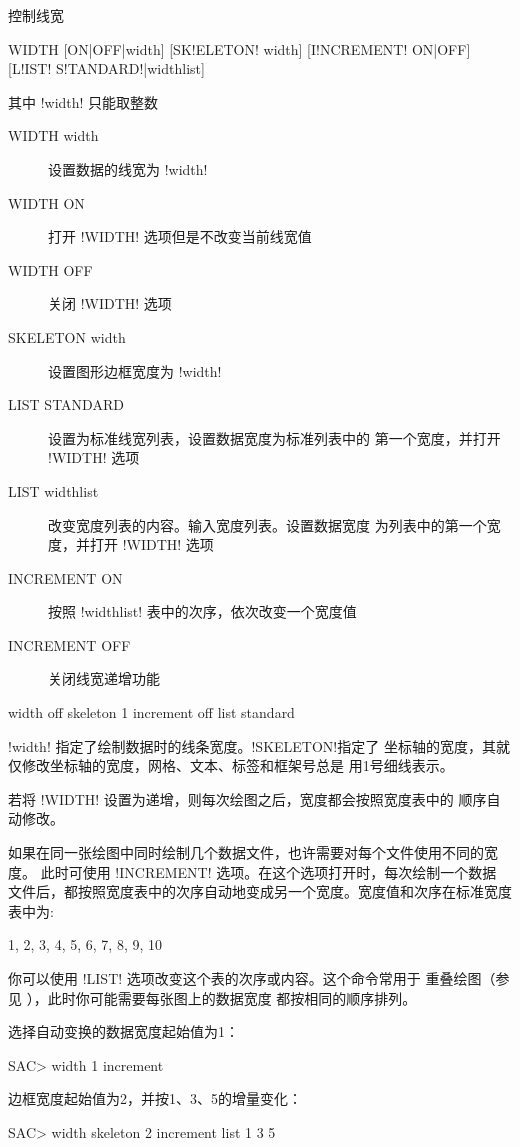 \label{cmd:width}

控制线宽

\begin{SACSTX}
WIDTH [ON|OFF|width] [SK!ELETON! width] [I!NCREMENT! ON|OFF] [L!IST! S!TANDARD!|widthlist]
\end{SACSTX}
其中 !width! 只能取整数

\begin{description}
\item [WIDTH width] 设置数据的线宽为 !width!
\item [WIDTH ON] 打开 !WIDTH! 选项但是不改变当前线宽值
\item [WIDTH OFF] 关闭 !WIDTH! 选项
\item [SKELETON width] 设置图形边框宽度为 !width!
\item [LIST STANDARD] 设置为标准线宽列表，设置数据宽度为标准列表中的
    第一个宽度，并打开 !WIDTH! 选项
\item [LIST widthlist] 改变宽度列表的内容。输入宽度列表。设置数据宽度
    为列表中的第一个宽度，并打开 !WIDTH! 选项
\item [INCREMENT ON] 按照 !widthlist! 表中的次序，依次改变一个宽度值
\item [INCREMENT OFF] 关闭线宽递增功能
\end{description}

\begin{SACDFT}
width off skeleton 1 increment off list standard
\end{SACDFT}

!width! 指定了绘制数据时的线条宽度。!SKELETON!指定了
坐标轴的宽度，其就仅修改坐标轴的宽度，网格、文本、标签和框架号总是
用1号细线表示。

若将 !WIDTH! 设置为递增，则每次绘图之后，宽度都会按照宽度表中的
顺序自动修改。

如果在同一张绘图中同时绘制几个数据文件，也许需要对每个文件使用不同的宽度。
此时可使用 !INCREMENT! 选项。在这个选项打开时，每次绘制一个数据
文件后，都按照宽度表中的次序自动地变成另一个宽度。宽度值和次序在标准宽度
表中为:
\begin{SACCode}
1, 2, 3, 4, 5, 6, 7, 8, 9, 10
\end{SACCode}
你可以使用 !LIST! 选项改变这个表的次序或内容。这个命令常用于
重叠绘图（参见 ），此时你可能需要每张图上的数据宽度
都按相同的顺序排列。

选择自动变换的数据宽度起始值为1：
\begin{SACCode}
SAC> width 1 increment
\end{SACCode}

边框宽度起始值为2，并按1、3、5的增量变化：
\begin{SACCode}
SAC> width skeleton 2 increment list 1 3 5
\end{SACCode}
